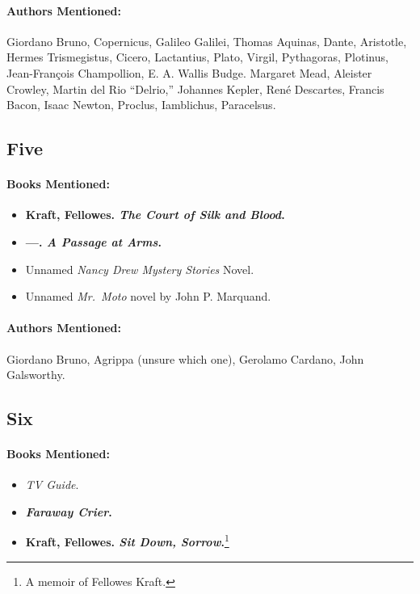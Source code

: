 \documentclass[12pt]{article}
\providecommand{\tightlist}{%
  \setlength{\itemsep}{0pt}\setlength{\parskip}{0pt}}
\begin{document}
\paragraph{Authors Mentioned:}\label{authors-mentioned-8}

Giordano Bruno, Copernicus, Galileo Galilei, Thomas Aquinas, Dante, Aristotle, Hermes Trismegistus, Cicero, Lactantius, Plato, Virgil, Pythagoras, Plotinus, Jean-François Champollion, E. A. Wallis Budge. Margaret Mead, Aleister Crowley, Martin del Rio ``Delrio,'' Johannes Kepler, René Descartes, Francis Bacon, Isaac Newton, Proclus, Iamblichus, Paracelsus.

\subsection{Five}\label{five-1}

\paragraph{Books Mentioned:}\label{books-mentioned-12}

\begin{itemize}
\tightlist
\item
  \textbf{Kraft, Fellowes. \emph{The Court of Silk and Blood}.}
\item
  \textbf{---. \emph{A Passage at Arms}.}
\item
  Unnamed \emph{Nancy Drew Mystery Stories} Novel.
\item
  Unnamed \emph{Mr.~Moto} novel by John P. Marquand.
\end{itemize}

\paragraph{Authors Mentioned:}\label{authors-mentioned-9}

Giordano Bruno, Agrippa (unsure which one), Gerolamo Cardano, John Galsworthy.

\subsection{Six}\label{six-1}

\paragraph{Books Mentioned:}\label{books-mentioned-13}

\begin{itemize}
\tightlist
\item
  \emph{TV Guide}.
\item
  \textbf{\emph{Faraway Crier}.}
\item
  \textbf{Kraft, Fellowes. \emph{Sit Down, Sorrow}.}\footnote{A memoir of Fellowes Kraft.}
\end{itemize}
\end{document}
